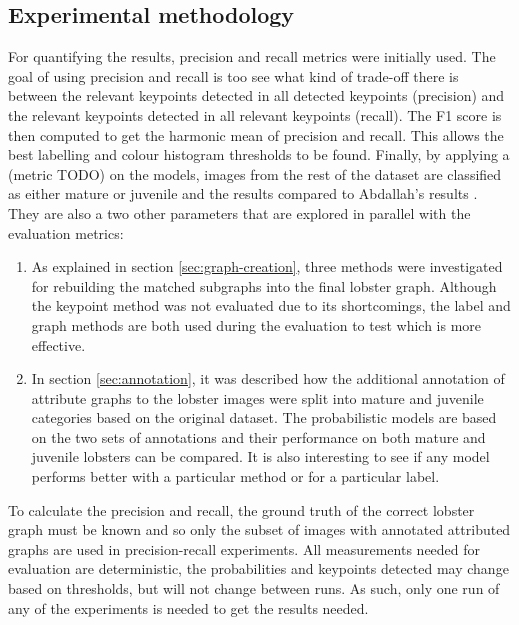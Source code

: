 \subsection{Experimental methodology}
For quantifying the results, precision and recall metrics were initially used. The goal of using precision and recall is too see what kind of trade-off there is between the relevant keypoints detected in all detected keypoints (precision) and the relevant keypoints detected in all relevant keypoints (recall). The F1 score is then computed to get the harmonic mean of precision and recall. This allows the best labelling and colour histogram thresholds to be found. Finally, by applying a (metric TODO) on the models, images from the rest of the dataset are classified as either mature or juvenile and the results compared to Abdallah's results \cite{lobster-thesis}.
\n
They are also a two other parameters that are explored in parallel with the evaluation metrics:
\begin{enumerate}
\item As explained in section \ref{sec:graph-creation}, three methods were investigated for rebuilding the matched subgraphs into the final lobster graph. Although the keypoint method was not evaluated due to its shortcomings, the label and graph methods are both used during the evaluation to test which is more effective.
\item In section \ref{sec:annotation}, it was described how the additional annotation of attribute graphs to the lobster images were split into mature and juvenile categories based on the original dataset. The probabilistic models are based on the two sets of annotations and their performance on both mature and juvenile lobsters can be compared. It is also interesting to see if any model performs better with a particular method or for a particular label. 
\end{enumerate}
To calculate the precision and recall, the ground truth of the correct lobster graph must be known and so only the subset of images with annotated attributed graphs are used in precision-recall experiments. 
\n
All measurements needed for evaluation are deterministic, the probabilities and keypoints detected may change based on thresholds, but will not change between runs. As such, only one run of any of the experiments is needed to get the results needed.


